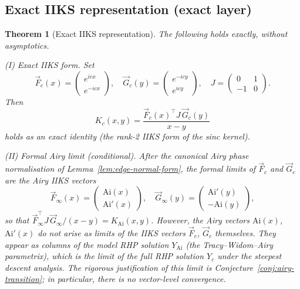 \documentclass[12pt,a4paper]{amsart}
\newtheorem{theorem}{Theorem}[section]
\theoremstyle{definition}
\theoremstyle{remark}
\newcommand{\Ai}{\mathrm{Ai}}
\begin{document}
\subsection{Exact IIKS representation (exact layer)}

\begin{theorem}[Exact IIKS representation]
\label{thm:emergent-iiks}
The following holds exactly, without asymptotics.

\medskip
\textup{(I) Exact IIKS form.}
Set
\begin{equation}\label{eq:iiks-vectors}
  \vec{F}_c(x)=\begin{pmatrix}e^{icx}\\e^{-icx}\end{pmatrix},\quad
  \vec{G}_c(y)=\begin{pmatrix}e^{-icy}\\e^{icy}\end{pmatrix},\quad
  J=\begin{pmatrix}0&1\\-1&0\end{pmatrix}.
\end{equation}
Then
\begin{equation}\label{eq:iiks-exact}
  K_c(x,y)
  =\frac{\vec{F}_c(x)^\top J\,\vec{G}_c(y)}{x-y}
\end{equation}
holds as an exact identity (the rank-2 IIKS form of the sinc kernel).

\medskip
\textup{(II) Formal Airy limit (conditional).}
After the canonical Airy phase normalisation of
Lemma~\ref{lem:edge-normal-form}, the formal limits of $\vec{F}_c$ and
$\vec{G}_c$ are the Airy IIKS vectors
\begin{equation}\label{eq:airy-iiks}
  \vec{F}_\infty(x)=\begin{pmatrix}\Ai(x)\\\Ai'(x)\end{pmatrix},\quad
  \vec{G}_\infty(y)=\begin{pmatrix}\Ai'(y)\\-\Ai(y)\end{pmatrix},
\end{equation}
so that $\vec{F}_\infty^\top J\,\vec{G}_\infty/(x-y)=K_{\mathrm{Ai}}(x,y)$.
\emph{However, the Airy vectors $\Ai(x)$, $\Ai'(x)$ do not arise as
limits of the IIKS vectors $\vec{F}_c$, $\vec{G}_c$ themselves.
They appear as columns of the model RHP solution $Y_{\mathrm{Ai}}$
(the Tracy--Widom--Airy parametrix), which is the limit of the full
RHP solution $Y_c$ under the steepest descent analysis.}
The rigorous justification of this limit is
Conjecture~\ref{conj:airy-transition}; in particular, there is
no vector-level convergence.
\end{theorem}
\end{document}

